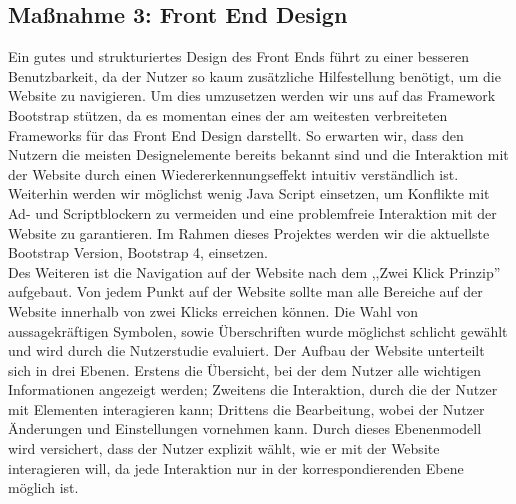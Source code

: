 \documentclass[accentcolor=tud0b,12pt,paper=a4]{tudreport}
\begin{document}
	\subsection{Maßnahme 3: Front End Design}
Ein gutes und strukturiertes Design des Front Ends führt zu einer besseren Benutzbarkeit, da der Nutzer so kaum zusätzliche Hilfestellung benötigt, um die Website zu navigieren.
Um dies umzusetzen werden wir uns auf das Framework Bootstrap stützen, da es momentan eines der am weitesten verbreiteten Frameworks für das Front End Design darstellt. So erwarten wir, dass den Nutzern die meisten Designelemente bereits bekannt sind und die Interaktion mit der Website durch einen Wiedererkennungseffekt intuitiv verständlich ist. Weiterhin werden wir möglichst wenig Java Script einsetzen, um Konflikte mit Ad- und Scriptblockern zu vermeiden und eine problemfreie Interaktion mit der Website zu garantieren.
Im Rahmen dieses Projektes werden wir die aktuellste Bootstrap Version, Bootstrap 4, einsetzen.\\
Des Weiteren ist die Navigation auf der Website nach dem ,,Zwei Klick Prinzip''  aufgebaut. Von jedem Punkt auf der Website sollte man alle Bereiche auf der Website innerhalb von zwei Klicks erreichen können. Die Wahl von aussagekräftigen Symbolen, sowie Überschriften wurde möglichst schlicht gewählt und wird durch die Nutzerstudie evaluiert. Der Aufbau der Website unterteilt sich in drei Ebenen. Erstens die Übersicht, bei der dem Nutzer alle wichtigen Informationen angezeigt werden; Zweitens die Interaktion, durch die der Nutzer mit Elementen interagieren kann; Drittens die Bearbeitung, wobei der Nutzer Änderungen und Einstellungen vornehmen kann. Durch dieses Ebenenmodell wird versichert, dass der Nutzer explizit wählt, wie er mit der Website interagieren will, da jede Interaktion nur in der korrespondierenden Ebene möglich ist.\\
\end{document}
